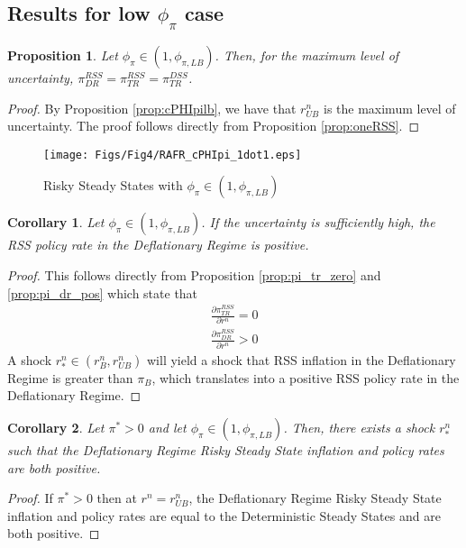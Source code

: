\documentclass[11pt]{article}
\newtheorem{proposition}{Proposition}
\newtheorem{corollary}{Corollary}[proposition]
\begin{document}
\subsection{Results for low $\phi_{\pi}$ case}	

	\begin{proposition}
		Let $\phi_{\pi}\in(1,\phi_{\pi,LB})$. Then, for the maximum level of uncertainty, $\pi_{DR}^{RSS} = \pi_{TR}^{RSS} = \pi_{TR}^{DSS}$. 
	\end{proposition}
	\begin{proof}
		By Proposition \ref{prop:cPHIpilb}, we have that $r^n_{UB}$ is the maximum level of uncertainty. The proof follows directly from Proposition \ref{prop:oneRSS}.
	\end{proof}
	
	\begin{figure}[!ht]
		\begin{center}
			\caption{Risky Steady States with  $\phi_{\pi}\in(1,\phi_{\pi,LB})$}
			\texttt{[image: Figs/Fig4/RAFR\_cPHIpi\_1dot1.eps]}\label{fig:RAFR_smallcPHIpi}
		\end{center}
	\end{figure}
	
	\begin{corollary}
		Let $\phi_{\pi}\in(1,\phi_{\pi,LB})$. If the uncertainty is sufficiently high, the RSS policy rate in the Deflationary Regime is positive. 
	\end{corollary}
	\begin{proof}
		This follows directly from Proposition \ref{prop:pi_tr_zero} and \ref{prop:pi_dr_pos} which state that
		\begin{align*}
			\frac{\partial\pi_{TR}^{RSS}}{\partial r^n} = 0\\
			\frac{\partial\pi_{DR}^{RSS}}{\partial r^n} > 0
		\end{align*} 
		A shock $r^n_{*} \in (r^n_{B}, r^n_{UB})$ will yield a shock that RSS inflation in the Deflationary Regime is greater than $\pi_{B}$, which translates into a positive RSS policy rate in the Deflationary Regime.
	\end{proof}
	\begin{corollary}
		Let $\pi^* > 0$ and let $\phi_{\pi}\in(1,\phi_{\pi,LB})$. Then, there exists a shock $r^n_*$ such that the Deflationary Regime Risky Steady State inflation and policy rates are both positive. 
	\end{corollary}
	\begin{proof}
		If $\pi^* > 0$ then at $r^n = r^n_{UB}$, the Deflationary Regime Risky Steady State inflation and policy rates are equal to the Deterministic Steady States and are both positive. 
	\end{proof}
	
\end{document}
